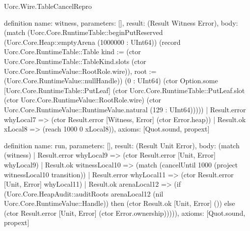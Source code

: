 \begin{lexlean}{Uorc.Wire.TableCancelRepro}
\begin{semanticmodule}
definition{
  name: witness,
  parameters: [],
  result: (Result Witness Error),
  body: (match (Uorc.Core.RuntimeTable::beginPutReserved (Uorc.Core.Heap::emptyArena (1000000 : UInt64)) (record Uorc.Core.RuntimeTable::Table {kind := (ctor Uorc.Core.RuntimeTable::TableKind.slots (ctor Uorc.Core.RuntimeValue::RootRole.wire)), root := (Uorc.Core.RuntimeValue::nullHandle)}) (0 : UInt64) (ctor Option.some [Uorc.Core.RuntimeTable::PutLeaf] (ctor Uorc.Core.RuntimeTable::PutLeaf.slot (ctor Uorc.Core.RuntimeValue::RootRole.wire) (ctor Uorc.Core.RuntimeValue::RuntimeValue.natural (129 : UInt64)))))
    | Result.error whyLocal7 => (ctor Result.error [Witness, Error] (ctor Error.heap))
    | Result.ok xLocal8 => (reach 1000 0 xLocal8)),
  axioms: [Quot.sound, propext]
}

definition{
  name: run,
  parameters: [],
  result: (Result Unit Error),
  body: (match (witness)
    | Result.error whyLocal9 => (ctor Result.error [Unit, Error] whyLocal9)
    | Result.ok witnessLocal10 => (match (cancelUntil 1000 (project witnessLocal10 transition))
      | Result.error whyLocal11 => (ctor Result.error [Unit, Error] whyLocal11)
      | Result.ok arenaLocal12 => (if (Uorc.Core.HeapAudit::auditRoots arenaLocal12 (nil Uorc.Core.RuntimeValue::Handle)) then (ctor Result.ok [Unit, Error] ()) else (ctor Result.error [Unit, Error] (ctor Error.ownership))))),
  axioms: [Quot.sound, propext]
}
\end{semanticmodule}
\end{lexlean}
